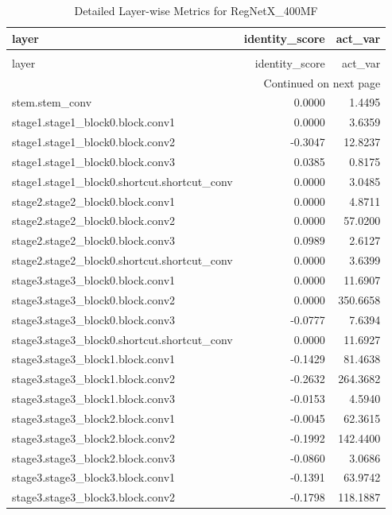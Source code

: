 \begin{longtable}{lrr}
\caption{Detailed Layer-wise Metrics for RegNetX_400MF} \label{tab:layer_metrics_regnetx_400mf} \\
\toprule
layer & identity_score & act_var \\
\midrule
\endfirsthead
\caption[]{Detailed Layer-wise Metrics for RegNetX_400MF} \\
\toprule
layer & identity_score & act_var \\
\midrule
\endhead
\midrule
\multicolumn{3}{r}{Continued on next page} \\
\midrule
\endfoot
\bottomrule
\endlastfoot
stem.stem_conv & 0.0000 & 1.4495 \\
stage1.stage1_block0.block.conv1 & 0.0000 & 3.6359 \\
stage1.stage1_block0.block.conv2 & -0.3047 & 12.8237 \\
stage1.stage1_block0.block.conv3 & 0.0385 & 0.8175 \\
stage1.stage1_block0.shortcut.shortcut_conv & 0.0000 & 3.0485 \\
stage2.stage2_block0.block.conv1 & 0.0000 & 4.8711 \\
stage2.stage2_block0.block.conv2 & 0.0000 & 57.0200 \\
stage2.stage2_block0.block.conv3 & 0.0989 & 2.6127 \\
stage2.stage2_block0.shortcut.shortcut_conv & 0.0000 & 3.6399 \\
stage3.stage3_block0.block.conv1 & 0.0000 & 11.6907 \\
stage3.stage3_block0.block.conv2 & 0.0000 & 350.6658 \\
stage3.stage3_block0.block.conv3 & -0.0777 & 7.6394 \\
stage3.stage3_block0.shortcut.shortcut_conv & 0.0000 & 11.6927 \\
stage3.stage3_block1.block.conv1 & -0.1429 & 81.4638 \\
stage3.stage3_block1.block.conv2 & -0.2632 & 264.3682 \\
stage3.stage3_block1.block.conv3 & -0.0153 & 4.5940 \\
stage3.stage3_block2.block.conv1 & -0.0045 & 62.3615 \\
stage3.stage3_block2.block.conv2 & -0.1992 & 142.4400 \\
stage3.stage3_block2.block.conv3 & -0.0860 & 3.0686 \\
stage3.stage3_block3.block.conv1 & -0.1391 & 63.9742 \\
stage3.stage3_block3.block.conv2 & -0.1798 & 118.1887 \\

\end{longtable}
